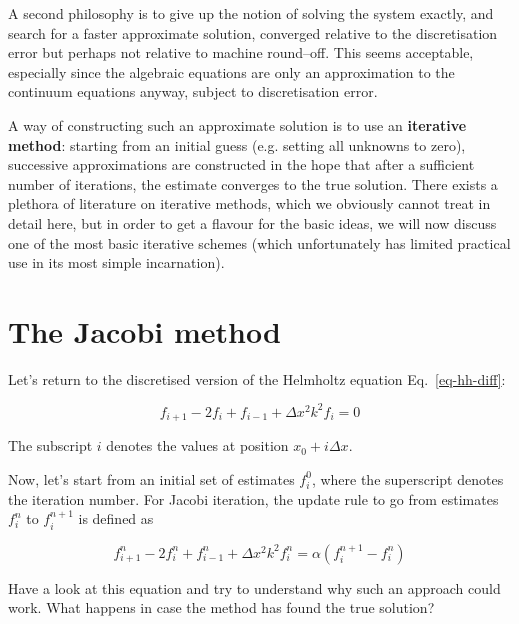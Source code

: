A second philosophy is to give up the notion of solving the system exactly, and search for a faster approximate solution, converged relative to the discretisation error but perhaps not relative to machine round--off. This seems acceptable, especially since the algebraic equations are only an approximation to the continuum equations anyway, subject to discretisation error.

A way of constructing such an approximate solution is to use an \textbf{iterative method}: starting from an initial guess (e.g. setting all unknowns to zero), successive approximations  are constructed in the hope that after a sufficient number of iterations, the estimate converges to the true solution. There exists a plethora of literature on iterative methods, which we obviously cannot treat in detail here, but in order to get a flavour for the basic ideas, we will now discuss one of the most basic iterative schemes (which unfortunately has limited practical use in its most simple incarnation).


\pagebreak

\section{The Jacobi method}

Let's return to the discretised version of the Helmholtz equation Eq.~\ref{eq-hh-diff}:

\begin{equation}
f_{i+1} -2 f_i + f_{i-1} +  \Delta x^2 k^2 f_i = 0 \label{eq-hh-diff-2}
\end{equation}  

The subscript $i$ denotes the values at position $x_0 + i \Delta x$.

Now, let's start from an initial set of estimates $f_i^0$, where the superscript denotes the iteration number. For Jacobi iteration, the update rule to go from estimates $f_i^n$ to $ f_i^{n+1}$ is defined as

\begin{equation}
f_{i+1}^n -2 f_i^n + f_{i-1}^n +  \Delta x^2 k^2 f_i^n = \alpha (f_i^{n+1} - f_i^n ) \label{eq-jacobi}
\end{equation}  

\begin{cue}
Have a look at this equation and try to understand why such an approach could work. What happens in case the method has found the true solution?  
\end{cue}


